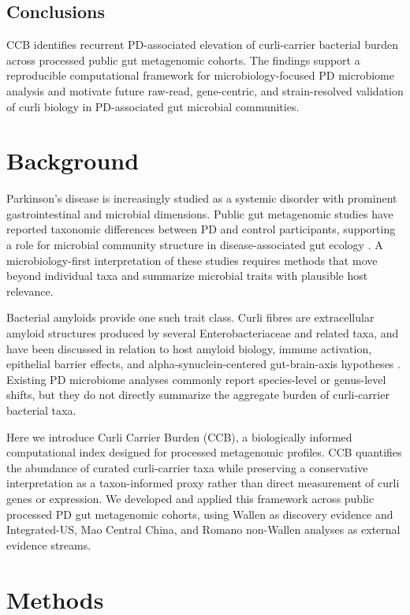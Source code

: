 \documentclass[12pt]{article}
\begin{document}
\subsection*{Conclusions}
CCB identifies recurrent PD-associated elevation of curli-carrier bacterial burden across processed public gut metagenomic cohorts. The findings support a reproducible computational framework for microbiology-focused PD microbiome analysis and motivate future raw-read, gene-centric, and strain-resolved validation of curli biology in PD-associated gut microbial communities.

\section*{Background}
Parkinson's disease is increasingly studied as a systemic disorder with prominent gastrointestinal and microbial dimensions. Public gut metagenomic studies have reported taxonomic differences between PD and control participants, supporting a role for microbial community structure in disease-associated gut ecology \citep{Romano2021NPJPD,Wallen2022NatCommun}. A microbiology-first interpretation of these studies requires methods that move beyond individual taxa and summarize microbial traits with plausible host relevance.

Bacterial amyloids provide one such trait class. Curli fibres are extracellular amyloid structures produced by several Enterobacteriaceae and related taxa, and have been discussed in relation to host amyloid biology, immune activation, epithelial barrier effects, and alpha-synuclein-centered gut-brain-axis hypotheses \citep{Barnhart2006Curli,Chen2016CurliAlphaSyn}. Existing PD microbiome analyses commonly report species-level or genus-level shifts, but they do not directly summarize the aggregate burden of curli-carrier bacterial taxa.

Here we introduce Curli Carrier Burden (CCB), a biologically informed computational index designed for processed metagenomic profiles. CCB quantifies the abundance of curated curli-carrier taxa while preserving a conservative interpretation as a taxon-informed proxy rather than direct measurement of curli genes or expression. We developed and applied this framework across public processed PD gut metagenomic cohorts, using Wallen as discovery evidence and Integrated-US, Mao Central China, and Romano non-Wallen analyses as external evidence streams.

\section*{Methods}
\end{document}
